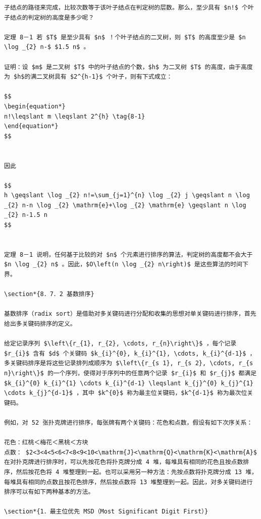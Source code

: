 \documentclass[10pt]{article}
\begin{document}
\begin{verbatim}
子结点的路径来完成，比较次数等于该叶子结点在判定树的层数。那么，至少具有 $n!$ 个叶子结点的判定树的高度是多少呢？

定理 8－1 若 $T$ 是至少具有 $n$ ！个叶子结点的二叉树，则 $T$ 的高度至少是 $n \log _{2} n-$ $1.5 n$ 。

证明：设 $m$ 是二叉树 $T$ 中的叶子结点的个数，$h$ 为二叉树 $T$ 的高度，由于高度为 $h$的满二叉树具有 $2^{h-1}$ 个叶子，则有下式成立：

$$
\begin{equation*}
n!\leqslant m \leqslant 2^{h} \tag{8-1}
\end{equation*}
$$


因此

$$
h \geqslant \log _{2} n!=\sum_{j=1}^{n} \log _{2} j \geqslant n \log _{2} n-n \log _{2} \mathrm{e}+\log _{2} \mathrm{e} \geqslant n \log _{2} n-1.5 n
$$


定理 8－1 说明，任何基于比较的对 $n$ 个元素进行排序的算法，判定树的高度都不会大于 $n \log _{2} n$ 。因此，$O\left(n \log _{2} n\right)$ 是这些算法的时间下界。

\section*{8．7．2 基数排序}

基数排序（radix sort）是借助对多关键码进行分配和收集的思想对单关键码进行排序，首先给出多关键码排序的定义。

给定记录序列 $\left\{r_{1}, r_{2}, \cdots, r_{n}\right\}$ ，每个记录 $r_{i}$ 含有 $d$ 个关键码 $k_{i}^{0}, k_{i}^{1}, \cdots, k_{i}^{d-1}$ ，多关键码排序是将这些记录排列成顺序为 $\left\{r_{s 1}, r_{s 2}, \cdots, r_{s n}\right\}$ 的一个序列，使得对于序列中的任意两个记录 $r_{i}$ 和 $r_{j}$ 都满足 $k_{i}^{0} k_{i}^{1} \cdots k_{i}^{d-1} \leqslant k_{j}^{0} k_{j}^{1} \cdots k_{j}^{d-1}$ ，其中 $k^{0}$ 称为最主位关键码，$k^{d-1}$ 称为最次位关键码。

例如，对 52 张扑克牌进行排序，每张牌有两个关键码：花色和点数，假设有如下次序关系：

花色：红桃＜梅花＜黑桃＜方块
点数： $2<3<4<5<6<7<8<9<10<\mathrm{J}<\mathrm{Q}<\mathrm{K}<\mathrm{A}$
在对扑克牌进行排序时，可以先按花色将扑克牌分成 4 堆，每堆具有相同的花色且按点数排序，然后按花色将 4 堆整理到一起。也可以采用另一种方法：先按点数将扑克牌分成 13 堆，每堆具有相同的点数且按花色排序，然后按点数将 13 堆整理到一起。因此，对多关键码进行排序可以有如下两种基本的方法。

\section*{1．最主位优先 MSD（Most Significant Digit First）}


\end{verbatim}
\end{document}

